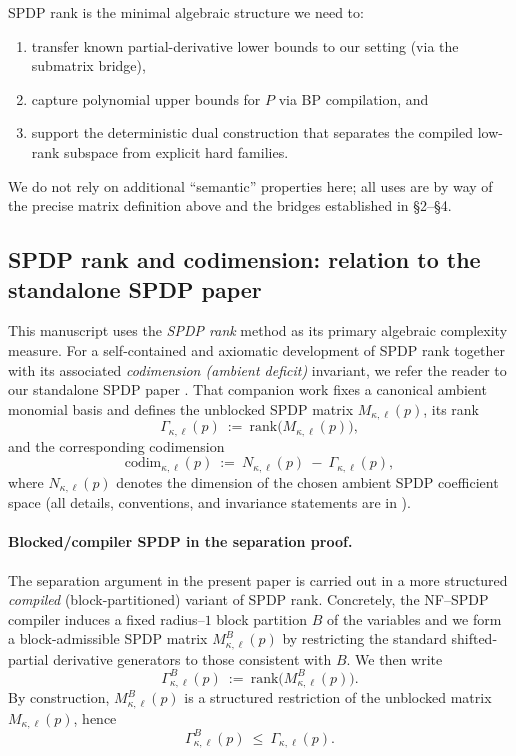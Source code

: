 \documentclass[12pt]{article}
\theoremstyle{definition}
\theoremstyle{definition}
\theoremstyle{remark}
\theoremstyle{remark}
\begin{document}
SPDP rank is the minimal algebraic structure we need to:
\begin{enumerate}
\item transfer known partial-derivative lower bounds to our setting (via the submatrix bridge),
\item capture polynomial upper bounds for $P$ via BP compilation, and
\item support the deterministic dual construction that separates the compiled low-rank subspace from explicit hard families.
\end{enumerate}

We do not rely on additional ``semantic'' properties here; all uses are by way of the precise matrix definition above and the bridges established in \S2--\S4.

\subsection{SPDP rank and codimension: relation to the standalone SPDP paper}
\label{subsec:spdp-toolkit-relation}

This manuscript uses the \emph{SPDP rank} method as its primary algebraic
complexity measure. For a self-contained and axiomatic development of SPDP
rank together with its associated \emph{codimension (ambient deficit)}
invariant, we refer the reader to our standalone SPDP paper
\cite{SPDP_CODIMENSION_TOOLKIT}.  That companion work fixes a canonical
ambient monomial basis and defines the unblocked SPDP matrix
$M_{\kappa,\ell}(p)$, its rank
\[
\Gamma_{\kappa,\ell}(p)\ :=\ \mathrm{rank}\big(M_{\kappa,\ell}(p)\big),
\]
and the corresponding codimension
\[
\mathrm{codim}_{\kappa,\ell}(p)\ :=\ N_{\kappa,\ell}(p)\ -\ \Gamma_{\kappa,\ell}(p),
\]
where $N_{\kappa,\ell}(p)$ denotes the dimension of the chosen ambient SPDP
coefficient space (all details, conventions, and invariance statements are
in \cite{SPDP_CODIMENSION_TOOLKIT}).

\paragraph{Blocked/compiler SPDP in the separation proof.}
The separation argument in the present paper is carried out in a more
structured \emph{compiled} (block-partitioned) variant of SPDP rank.  Concretely,
the NF--SPDP compiler induces a fixed radius--$1$ block partition $B$ of the
variables and we form a block-admissible SPDP matrix $M^{B}_{\kappa,\ell}(p)$ by
restricting the standard shifted-partial derivative generators to those
consistent with $B$.
We then write
\[
\Gamma^{B}_{\kappa,\ell}(p)\ :=\ \mathrm{rank}\big(M^{B}_{\kappa,\ell}(p)\big).
\]
By construction, $M^{B}_{\kappa,\ell}(p)$ is a structured restriction of the
unblocked matrix $M_{\kappa,\ell}(p)$, hence
\begin{equation}
\label{eq:blocked-vs-unblocked-rank}
\Gamma^{B}_{\kappa,\ell}(p)\ \le\ \Gamma_{\kappa,\ell}(p).
\end{equation}
\end{document}
